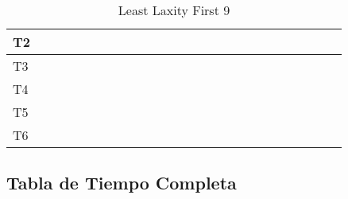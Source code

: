 \documentclass[xcolor=table]{beamer}
\begin{document}
\begin{frame}
\begin{table}
{\begin{tabular}{|l|l|l|l|l|l|l|l|l|l|l|l|l|l|l|l|l|l|l|l|l|l|l|l|l|}
T2 & & \cellcolor{purple} & & \cellcolor{purple} & & \cellcolor{purple} & & \cellcolor{purple} & & \cellcolor{purple} & & & \cellcolor{purple} & & & \cellcolor{purple} & & & \cellcolor{purple} & & & \cellcolor{purple} & & \\ \hline 
T3 & \cellcolor{cyan} & & \cellcolor{cyan} & & \cellcolor{cyan} & & \cellcolor{cyan} & & \cellcolor{cyan} & & & \cellcolor{cyan} & & & \cellcolor{cyan} & & & \cellcolor{cyan} & & & \cellcolor{cyan} & & & \cellcolor{cyan} \\ \hline 
T4 & & & & & & & & & & & & & & & & & & & & & & & & \\ \hline 
T5 & & & & & & & & & & & & & & & & & & & & & & & & \\ \hline 
T6 & & & & & & & & & & & & & & & & & & & & & & & & \\ \hline 
\end{tabular} 
} 
\caption{ Least Laxity First 9 } 
\end{table} 
\end{frame} 

\subsection{Tabla de Tiempo Completa} 
\end{document}
